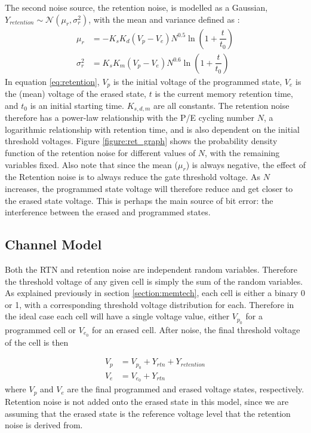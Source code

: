 \documentclass[11pt]{article}
\numberwithin{equation}{subsection}
\begin{document}
The second noise source, the retention noise, is modelled as a Gaussian, $Y_{retention} \sim \mathcal{N}(\mu_r,\sigma_r^2)$, with the mean and variance defined as \cite{dong2012estimating}:
\begin{equation} \label{eq:retention}
\begin{aligned}
\mu_r &= -K_sK_d(V_p-V_e)N^{0.5}\ln\left(1+\dfrac{t}{t_0}\right)\\
\sigma_r^2 &= K_sK_m(V_p-V_e)N^{0.6}\ln\left(1+\dfrac{t}{t_0}\right)
\end{aligned}
\end{equation}
In equation \ref{eq:retention}, $V_p$ is the initial voltage of the programmed state, $V_e$ is the (mean) voltage of the erased state, $t$ is the current memory retention time, and $t_0$ is an initial starting time. $K_{s,d,m}$ are all constants. The retention noise therefore has a power-law relationship with the P/E cycling number $N$, a logarithmic relationship with retention time, and is also dependent on the initial threshold voltages. Figure \ref{figure:ret_graph} shows the probability density function of the retention noise for different values of $N$, with the remaining variables fixed. Also note that since the mean ($\mu_r$) is always negative, the effect of the Retention noise is to always reduce the gate threshold voltage. As $N$ increases, the programmed state voltage will therefore reduce and get closer to the erased state voltage. This is perhaps the main source of bit error: the interference between the erased and programmed states. 

\subsection{Channel Model} \label{section:memory_channel_model}
Both the RTN and retention noise are independent random variables. Therefore the threshold voltage of any given cell is simply the sum of the random variables. As explained previously in section \ref{section:memtech}, each cell is either a binary 0 or 1, with a corresponding threshold voltage distribution for each. Therefore in the ideal case each cell will have a single voltage value, either $V_{p_0}$ for a programmed cell or $V_{e_0}$ for an erased cell. After noise, the final threshold voltage of the cell is then

\begin{equation} \label{eq:additive_memory_noise_model}
\begin{aligned}
V_{p} &= V_{p_0} + Y_{rtn} + Y_{retention} \\
V_{e} &= V_{e_0} + Y_{rtn}
\end{aligned}
\end{equation}
where $V_{p}$ and $V_{e}$ are the final programmed and erased voltage states, respectively. Retention noise is not added onto the erased state in this model, since we are assuming that the erased state is the reference voltage level that the retention noise is derived from.
\bigskip
\end{document}
